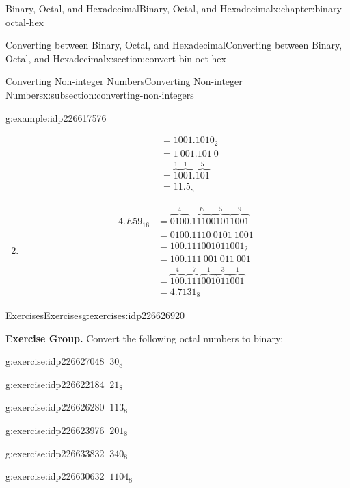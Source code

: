 \documentclass[twoside,10pt,]{book}
\numberwithin{equation}{section}
\newcommand{\amp}{&}
\begin{document}
\begin{chapterptx}{Binary, Octal, and Hexadecimal}{}{Binary, Octal, and Hexadecimal}{}{}{x:chapter:binary-octal-hex}
\begin{sectionptx}{Converting between Binary, Octal, and Hexadecimal}{}{Converting between Binary, Octal, and Hexadecimal}{}{}{x:section:convert-bin-oct-hex}
\begin{subsectionptx}{Converting Non-integer Numbers}{}{Converting Non-integer Numbers}{}{}{x:subsection:converting-non-integers}
\begin{example}{}{g:example:idp226617576}
\begin{enumerate}
\begin{align*}
\amp = 1001.1010_2\\
\amp = 1\ 001.101\ 0\\
\amp = \overbrace{1}^1\overbrace{001}^1.\overbrace{101}^5\\
\amp = 11.5_8
\end{align*}
%
\item{}%
\begin{align*}
4.E59_{16} \amp = \overbrace{0100}^4.\overbrace{1110}^E\overbrace{0101}^5\overbrace{1001}^9\\
\amp = 0100.1110\ 0101\ 1001\\
\amp = 100.111001011001_2\\
\amp = 100.111\ 001\ 011\ 001\\
\amp = \overbrace{100}^4.\overbrace{111}^7\overbrace{001}^1\overbrace{011}^3\overbrace{001}^1\\
\amp = 4.7131_8
\end{align*}
%
\end{enumerate}
\end{example}
\end{subsectionptx}
%
%
\typeout{************************************************}
\typeout{************************************************}
%
\begin{exercises-subsection}{Exercises}{}{Exercises}{}{}{g:exercises:idp226626920}
\par\medskip\noindent%
\textbf{Exercise Group.}\space\space%
Convert the following octal numbers to binary:\begin{exercisegroup}
\begin{divisionexerciseeg}{1}{}{}{g:exercise:idp226627048}%
\(\ 30_8\)\end{divisionexerciseeg}%
\begin{divisionexerciseeg}{2}{}{}{g:exercise:idp226622184}%
\(\ 21_8\)\end{divisionexerciseeg}%
\begin{divisionexerciseeg}{3}{}{}{g:exercise:idp226626280}%
\(\ 113_8\)\end{divisionexerciseeg}%
\begin{divisionexerciseeg}{4}{}{}{g:exercise:idp226623976}%
\(\ 201_8\)\end{divisionexerciseeg}%
\begin{divisionexerciseeg}{5}{}{}{g:exercise:idp226633832}%
\(\ 340_8\)\end{divisionexerciseeg}%
\begin{divisionexerciseeg}{6}{}{}{g:exercise:idp226630632}%
\(\ 1104_8\)\end{divisionexerciseeg}%

\end{exercisegroup}
\end{exercises-subsection}
\end{sectionptx}
\end{chapterptx}
\end{document}
